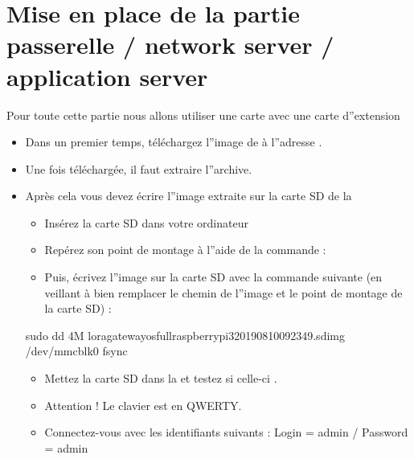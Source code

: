 \documentclass[letterpaper,10pt,french]{sphinxmanual}
\begin{document}
\section{Mise en place de la partie passerelle / network server / application server}
\label{\detokenize{AnnexeA:mise-en-place-de-la-partie-passerelle-network-server-application-server}}
Pour toute cette partie nous allons utiliser une carte  avec une carte d”extension 
\begin{itemize}
\item {} 
Dans un premier temps, téléchargez l”image de  à l”adresse .

\item {} 
Une fois téléchargée, il faut extraire l”archive.

\item {} 
Après cela vous devez écrire l”image extraite sur la carte SD de la 
\begin{itemize}
\item {} 
Insérez la carte SD dans votre ordinateur

\item {} 
Repérez son point de montage à l”aide de la commande : 

\item {} 
Puis, écrivez l”image sur la carte SD avec la commande suivante (en veillant à bien remplacer le chemin de l”image et le point de montage de la carte SD) :

\end{itemize}

\begin{sphinxVerbatim}[commandchars=\\\{\}]
sudo dd 4M lora\PYGZhy{}gateway\PYGZhy{}os\PYGZhy{}full\PYGZhy{}raspberrypi3\PYGZhy{}\PYGZhy{}20190810092349.sdimg /dev/mmcblk0 fsync
\end{sphinxVerbatim}
\begin{itemize}
\item {} 
Mettez la carte SD dans la  et testez si celle-ci .

\item {} 
Attention ! Le clavier est en QWERTY.

\item {} 
Connectez-vous avec les identifiants suivants : Login = admin / Password = admin

\end{itemize}

\end{itemize}
\end{document}
